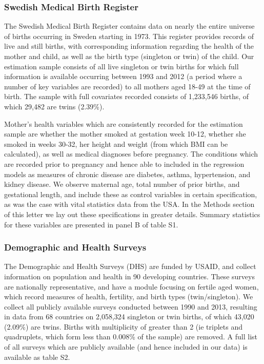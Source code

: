 \documentclass{nature}
\begin{document}
\begin{linenumbers}
\subsubsection{Swedish Medical Birth Register}
The Swedish Medical Birth Register contains data on nearly the entire universe of births occurring in Sweden starting in 1973\cite{EPC2003}.  This register provides records of live and still births, with corresponding information regarding the health of the mother and child, as well as the birth type (singleton or twin) of the child.  Our estimation sample consists of all live singleton or twin births for which full information is available occurring between 1993 and 2012 (a period where a number of key variables are recorded) to all mothers aged 18-49 at the time of birth.  The sample with full covariates recorded consists of 1,233,546 births, of which 29,482 are twins (2.39\%). 

Mother's health variables which are consistently recorded for the estimation sample are whether the mother smoked at gestation week 10-12, whether she smoked in weeks 30-32, her height and weight (from which BMI can be calculated), as well as medical diagnoses before pregnancy.  The conditions which are recorded prior to pregnancy and hence able to included in the regression models as measures of chronic disease are diabetes, asthma, hypertension, and kidney disease.  We observe maternal age, total number of prior births, and gestational length, and include these as control variables in certain specification, as was the case with vital statistics data from the USA.  In the Methods section of this letter we lay out these specifications in greater details.  Summary statistics for these variables are presented in panel B of table S1.

\subsubsection{Demographic and Health Surveys}
The Demographic and Health Surveys (DHS) are funded by USAID, and collect information on population and health in 90 developing countries.  These surveys are nationally representative, and have a module focusing on fertile aged women, which record measures of health, fertility, and birth types (twin/singleton).  We collect all publicly available surveys conducted between 1990 and 2013, resulting in data from 68 countries on 2,058,324 singleton or twin births, of which 43,020 (2.09\%) are twins.  Births with multiplicity of greater than 2 (ie triplets and quadruplets, which form less than 0.008\% of the sample) are removed.  A full list of all surveys which are publicly available (and hence included in our data) is available as table S2.


\end{linenumbers}
\end{document}
